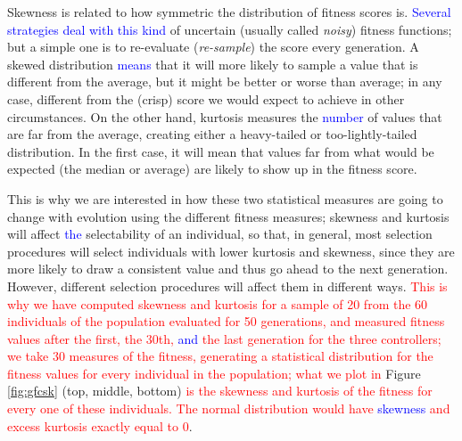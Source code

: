 \documentclass[10pt,journal,compsoc]{IEEEtran}
\begin{document}
Skewness is related to how symmetric the distribution of fitness
scores is.  \textcolor{blue}{Several strategies deal with this kind} of
uncertain (usually called {\em noisy}) fitness functions; but a simple
one is to re-evaluate ({\em re-sample}) the score every generation. A
skewed distribution  \textcolor{blue}{means} that it will more likely to sample a value
that is different from the average, but it might be better or worse
than average; in any case, different from the (crisp) score we would expect to
achieve in other circumstances. On the other hand, kurtosis measures
the  \textcolor{blue}{number} of values that are far from the average, creating either a
heavy-tailed or too-lightly-tailed distribution. In the first case, it
will mean that values far from what would be expected (the median or average) are likely to
show up in the fitness score.

This is why we are interested in how these two statistical measures
are going to change with evolution using the different fitness measures; skewness and kurtosis will  affect  \textcolor{blue}{the} selectability of an individual, so that, in general, most selection procedures will select
individuals with lower kurtosis and skewness, since they are more
likely to draw a consistent value and thus go ahead to the next
generation. However, different selection procedures will affect them
in different ways.  \textcolor{red}{This is why we have computed
  skewness and kurtosis for a sample of 20 from the 60 individuals of
  the population evaluated for 50 generations, and measured fitness
  values after the first, the 30th, \textcolor{blue}{and} the last generation for the three controllers;} \textcolor{red}{we take 30 measures of the
  fitness, generating a statistical distribution for the fitness
  values for every individual in the population; what we plot in}
Figure \ref{fig:gfcsk} (top, middle, bottom) \textcolor{red}{is the
  skewness and kurtosis of the fitness for every one of these
  individuals. The normal distribution would have  \textcolor{blue}{ skewness} and
  excess kurtosis exactly equal to 0}.
\end{document}
